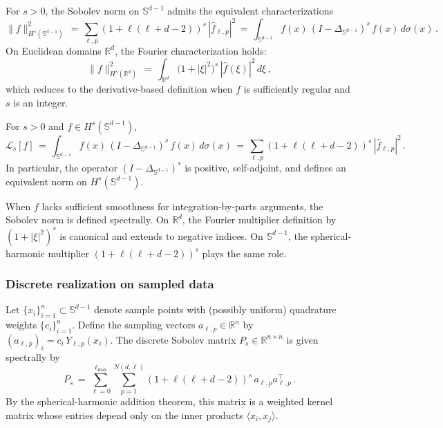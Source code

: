 \documentclass[a4paper]{article}
\begin{document}
\begin{proposition}
For $s>0$, the Sobolev norm on $\mathbb{S}^{d-1}$ admits the equivalent characterizations
\[
\|f\|_{H^s(\mathbb{S}^{d-1})}^2 \,=\, \sum_{\ell,p} (1+\ell(\ell+d-2))^{s}\, |\hat f_{\ell,p}|^2 \,=\, \int_{\mathbb{S}^{d-1}} f(x)\, (I - \Delta_{\mathbb{S}^{d-1}})^{s}\, f(x)\, d\sigma(x)\,.
\]
On Euclidean domains $\mathbb{R}^d$, the Fourier characterization holds:
\[
\|f\|_{H^s(\mathbb{R}^d)}^2 \,=\, \int_{\mathbb{R}^d} \bigl(1+|\xi|^2\bigr)^{s}\, |\hat f(\xi)|^2\, d\xi\,,
\]
which reduces to the derivative-based definition when $f$ is sufficiently regular and $s$ is an integer.
\end{proposition}

\begin{theorem}
For $s>0$ and $f \in H^s(\mathbb{S}^{d-1})$,
\[
\mathcal{L}_s[f] \,=\, \int_{\mathbb{S}^{d-1}} f(x)\, (I - \Delta_{\mathbb{S}^{d-1}})^{s}\, f(x)\, d\sigma(x) \,=\, \sum_{\ell,p} (1+\ell(\ell+d-2))^{s}\, |\hat f_{\ell,p}|^2\,.
\]
In particular, the operator $(I - \Delta_{\mathbb{S}^{d-1}})^{s}$ is positive, self-adjoint, and defines an equivalent norm on $H^s(\mathbb{S}^{d-1})$.
\end{theorem}

\begin{remark}
When $f$ lacks sufficient smoothness for integration-by-parts arguments, the Sobolev norm is defined spectrally. On $\mathbb{R}^d$, the Fourier multiplier definition by $(1+|\xi|^2)^s$ is canonical and extends to negative indices. On $\mathbb{S}^{d-1}$, the spherical-harmonic multiplier $(1+\ell(\ell+d-2))^s$ plays the same role.
\end{remark}

\subsubsection{Discrete realization on sampled data}

Let $\{x_i\}_{i=1}^n \subset \mathbb{S}^{d-1}$ denote sample points with (possibly uniform) quadrature weights $\{c_i\}_{i=1}^n$. Define the sampling vectors $a_{\ell,p} \in \mathbb{R}^n$ by $(a_{\ell,p})_i = c_i\, Y_{\ell,p}(x_i)$. The discrete Sobolev matrix $P_s \in \mathbb{R}^{n\times n}$ is given spectrally by
\[
P_s \,=\, \sum_{\ell=0}^{\ell_{\max}} \sum_{p=1}^{N(d,\ell)} (1+\ell(\ell+d-2))^{s}\, a_{\ell,p} a_{\ell,p}^\top\,.
\]
By the spherical-harmonic addition theorem, this matrix is a weighted kernel matrix whose entries depend only on the inner products $\langle x_i, x_j\rangle$.
\end{document}
